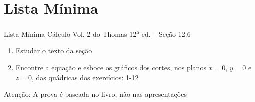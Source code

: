 \documentclass[fleqn,utf8,aspectratio=169,12pt]{beamer}
\begin{document}

\section{Lista Mínima}

\begin{frame}{Lista Mínima}
  Cálculo Vol. 2 do Thomas 12\textsuperscript{a} ed. -- Seção 12.6
  \begin{enumerate}
    \item Estudar o texto da seção
    \item Encontre a equação e esboce os gráficos dos cortes,
          nos planos $x=0$, $y=0$ e $z=0$, das quádricas dos exercícios: 1-12
  \end{enumerate}

  \vfill
  Atenção: A prova é baseada no livro, não nas apresentações
\end{frame}

\end{document}
